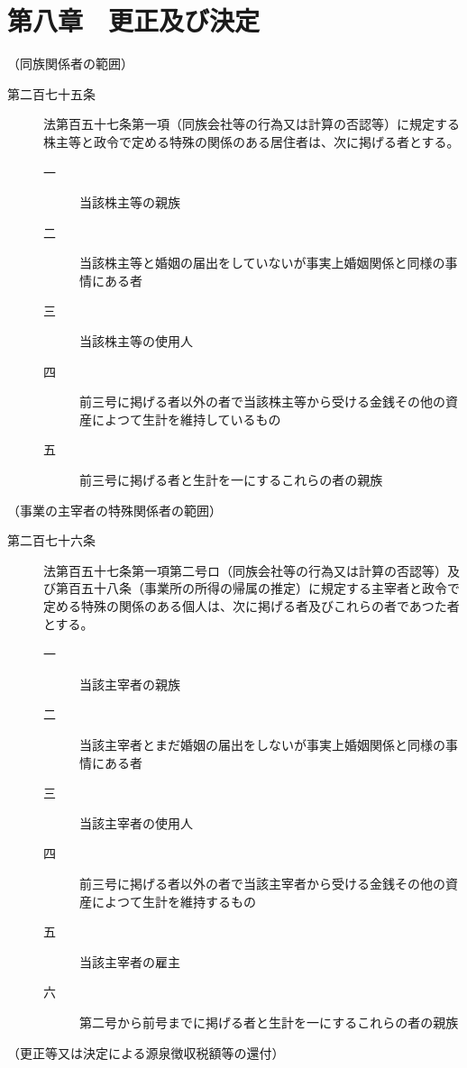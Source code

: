 \documentclass[twocolumn,a4j,10pt]{ltjtarticle}
\begin{document}
\section*{第八章　更正及び決定}
\noindent\hspace{10pt}（同族関係者の範囲）
\begin{description}
\item[第二百七十五条]法第百五十七条第一項（同族会社等の行為又は計算の否認等）に規定する株主等と政令で定める特殊の関係のある居住者は、次に掲げる者とする。
\begin{description}
\item[一]当該株主等の親族
\item[二]当該株主等と婚姻の届出をしていないが事実上婚姻関係と同様の事情にある者
\item[三]当該株主等の使用人
\item[四]前三号に掲げる者以外の者で当該株主等から受ける金銭その他の資産によつて生計を維持しているもの
\item[五]前三号に掲げる者と生計を一にするこれらの者の親族
\end{description}
\end{description}
\noindent\hspace{10pt}（事業の主宰者の特殊関係者の範囲）
\begin{description}
\item[第二百七十六条]法第百五十七条第一項第二号ロ（同族会社等の行為又は計算の否認等）及び第百五十八条（事業所の所得の帰属の推定）に規定する主宰者と政令で定める特殊の関係のある個人は、次に掲げる者及びこれらの者であつた者とする。
\begin{description}
\item[一]当該主宰者の親族
\item[二]当該主宰者とまだ婚姻の届出をしないが事実上婚姻関係と同様の事情にある者
\item[三]当該主宰者の使用人
\item[四]前三号に掲げる者以外の者で当該主宰者から受ける金銭その他の資産によつて生計を維持するもの
\item[五]当該主宰者の雇主
\item[六]第二号から前号までに掲げる者と生計を一にするこれらの者の親族
\end{description}
\end{description}
\noindent\hspace{10pt}（更正等又は決定による源泉徴収税額等の還付）
\end{document}
